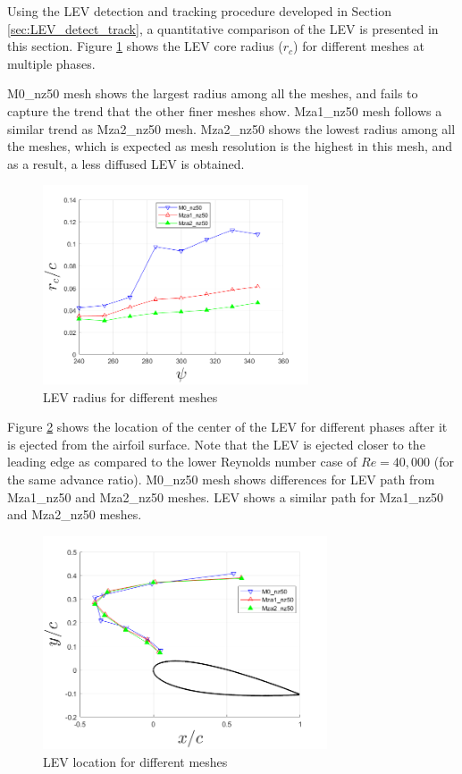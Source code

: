 Using the LEV detection and tracking procedure developed in Section \ref{sec:LEV_detect_track}, a quantitative comparison of the LEV is presented in this section. 
Figure \ref{fig:zonal_LEV_radius_Re200k} shows the LEV core radius ($r_c$) for different meshes at multiple phases.

M0\_nz50 mesh shows the largest radius among all the meshes, and fails to capture the trend that the other finer meshes show.
Mza1\_nz50 mesh follows a similar trend as Mza2\_nz50 mesh.
Mza2\_nz50 shows the lowest radius among all the meshes, which is expected as mesh resolution is the highest in this mesh, and as a result, a less diffused LEV is obtained.

\begin{figure}[H]
	\centering
	\includegraphics[width=0.7\textwidth]{figures/zonal_adapt_results/LEV_Re200k/LEV_radius_vp}
	\caption{ LEV radius for different meshes}
	\label{fig:zonal_LEV_radius_Re200k}
\end{figure}

Figure \ref{fig:zonal_LEV_location_Re200k} shows the location of the center of the LEV for different phases after it is ejected from the airfoil surface. 
Note that the LEV is ejected closer to the leading edge as compared to the lower Reynolds number case of $Re=40,000$ (for the same advance ratio).
M0\_nz50 mesh shows differences for LEV path from Mza1\_nz50 and Mza2\_nz50 meshes. LEV shows a similar path for Mza1\_nz50 and Mza2\_nz50 meshes.

\begin{figure}[H]
	\centering
	\includegraphics[width=0.75\textwidth]{figures/zonal_adapt_results/LEV_Re200k/LEV_location_Re200k}
	\caption{ LEV location for different meshes}
	\label{fig:zonal_LEV_location_Re200k}
\end{figure}

